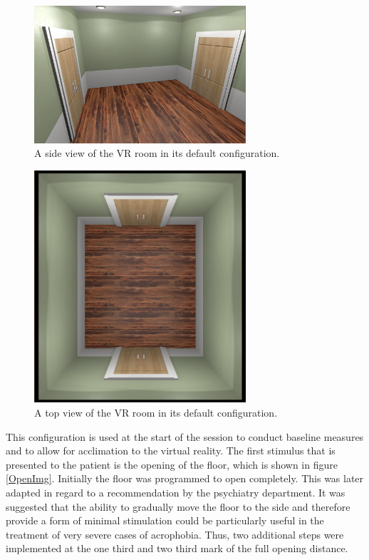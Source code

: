 \begin{figure}[ht]
\centering
\includegraphics[width=0.7\textwidth]{images/RoomDefault.png}
\caption{A side view of the VR room in its default configuration.}
\label{VRdefaultImg}
\end{figure}

\begin{figure}[ht]
\centering
\includegraphics[width=0.7\textwidth]{images/RoomDefaultTop.png}
\caption{A top view of the VR room in its default configuration.}
\label{VRdefaultTopImg}
\end{figure}

This configuration is used at the start of the session to conduct baseline measures and to allow for acclimation to the virtual reality. The first stimulus that is presented to the patient is the opening of the floor, which is shown in figure \ref{OpenImg}. Initially the floor was programmed to open completely. This was later adapted in regard to a recommendation by the psychiatry department. It was suggested that the ability to gradually move the floor to the side and therefore provide a form of minimal stimulation could be particularly useful in the treatment of very severe cases of acrophobia. Thus, two additional steps were implemented at the one third and two third mark of the full opening distance.

